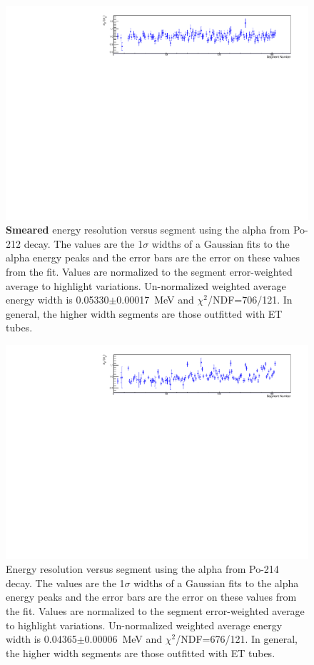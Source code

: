 \begin{figure}[!h]
\centering
\includegraphics[width=1.05\textwidth]{figures/PubBiPo212EsmearresvsCell.pdf}
\caption{\label{fig:EsmearresvsCell212}{\bf Smeared} energy resolution versus segment using the alpha from Po-212 decay. The values are the 1$\sigma$ widths of a Gaussian fits to the alpha energy peaks and the error bars are the error on these values from the fit. Values are normalized to the segment error-weighted average to highlight variations. Un-normalized weighted average energy width is 0.05330$\pm$0.00017~MeV and $\chi^2$/NDF=706/121.  In general, the higher width segments are those outfitted with ET tubes.}
\end{figure}
\begin{figure}[!h]
\centering
\includegraphics[width=1.05\textwidth]{figures/PubBiPo214EresvsCell.pdf}
\caption{\label{fig:EresvsCell214}Energy resolution versus segment using the alpha from Po-214 decay. The values are the 1$\sigma$ widths of a Gaussian fits to the alpha energy peaks and the error bars are the error on these values from the fit. Values are normalized to the segment error-weighted average to highlight variations. Un-normalized weighted average energy width is 0.04365$\pm$0.00006~MeV and $\chi^2$/NDF=676/121.  In general, the higher width segments are those outfitted with ET tubes.}
\end{figure}

